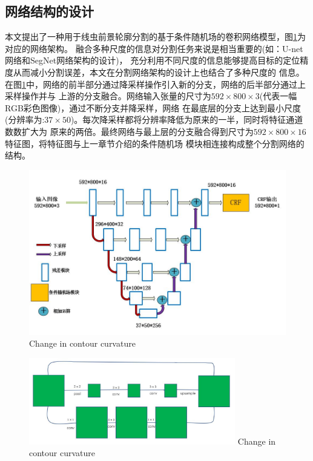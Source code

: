 \subsection{网络结构的设计}
	本文提出了一种用于线虫前景轮廓分割的基于条件随机场的卷积网络模型，图\ref{fig:chap5:arch}为对应的网络架构。
	融合多种尺度的信息对分割任务来说是相当重要的(如：U-net网络\cite{ronneberger2015u}和SegNet网络\cite{badrinarayanan2015segnet}架构的设计)，
	充分利用不同尺度的信息能够提高目标的定位精度从而减小分割误差，本文在分割网络架构的设计上也结合了多种尺度的
	信息。在图\ref{fig:chap5:arch}中，网络的前半部分通过降采样操作引入新的分支，网络的后半部分通过上采样操作并与
	上游的分支融合。网络输入张量的尺寸为$592\times800\times3$(代表一幅RGB彩色图像)，通过不断分支并降采样，网络
	在最底层的分支上达到最小尺度(分辨率为:$37\times50$)。每次降采样都将分辨率降低为原来的一半，同时将特征通道数数扩大为
	原来的两倍。最终网络与最上层的分支融合得到尺寸为$592\times800\times16$特征图，将特征图与上一章节介绍的条件随机场
	模块相连接构成整个分割网络的结构。
	\begin{figure}[thb]
	  \centering
	  \includegraphics[width=13cm]{figure/chap5/arch.jpg}
		{Change in contour curvature}
	  \label{fig:chap5:arch}
	\end{figure}
	\begin{figure}[htb]
	  \centering
	  \includegraphics[width=9cm]{figure/chap4/residualpooling.jpg}
		{Change in contour curvature}
	  \label{fig:chap4:respool}
	\end{figure}
